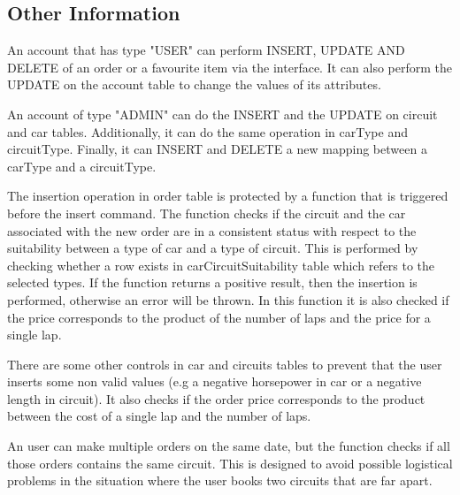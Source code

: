 \subsection{Other Information}

An account that has type "USER" can perform INSERT, UPDATE AND DELETE of an order or a favourite item via the interface. It can also perform the UPDATE on the account table to change the values of its attributes.

An account of type "ADMIN" can do the INSERT and the UPDATE on circuit and car tables. Additionally, it can do the same operation in carType and circuitType. Finally, it can INSERT and DELETE a new mapping between a carType and a circuitType.

The insertion operation in order table is protected by a function that is triggered before the insert command. The function checks if the circuit and the car associated with the new order are in a consistent status with respect to the suitability between a type of car and a type of circuit. This is performed by checking whether a row exists in carCircuitSuitability table which refers to the selected types. If the function returns a positive result, then the insertion is performed, otherwise an error will be thrown. In this function it is also checked if the price corresponds to the product of the number of laps and the price for a single lap.

There are some other controls in car and circuits tables to prevent that the user inserts some non valid values (e.g a negative horsepower in car or a negative length in circuit). It also checks if the order price corresponds to the product between the cost of a single lap and the number of laps.

An user can make multiple orders on the same date, but the function checks if all those orders contains the same circuit. This is designed to avoid possible logistical problems in the situation where the user books two circuits that are far apart.